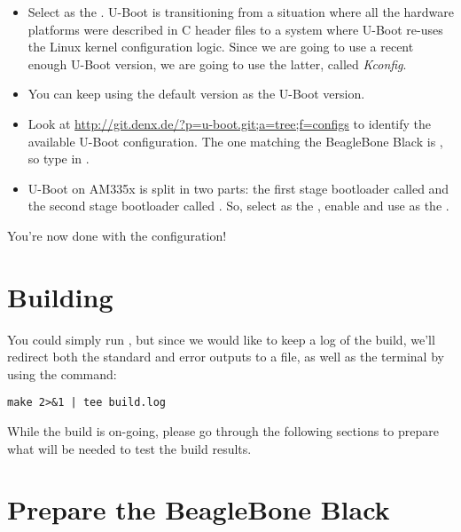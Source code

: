 \begin{itemize}
\begin{itemize}
  \item Select  as the . U-Boot is
    transitioning from a situation where all the hardware platforms
    were described in C header files to a system where U-Boot re-uses
    the Linux kernel configuration logic. Since we are going to use a
    recent enough U-Boot version, we are going to use the latter,
    called {\em Kconfig}.

  \item You can keep using the default  version as the
    U-Boot version.

  \item Look at
    \url{http://git.denx.de/?p=u-boot.git;a=tree;f=configs} to
    identify the available U-Boot configuration. The one matching the
    BeagleBone Black is , so type
     in .

  \item U-Boot on AM335x is split in two parts: the first stage
    bootloader called  and the second stage bootloader
    called . So, select  as the
    , enable  and use  as the .

  \end{itemize}

\end{itemize}

You're now done with the configuration!

\section{Building}

You could simply run , but since we would like to keep a
log of the build, we'll redirect both the standard and error outputs
to a file, as well as the terminal by using the  command:

\begin{verbatim}
make 2>&1 | tee build.log
\end{verbatim}

While the build is on-going, please go through the following sections
to prepare what will be needed to test the build results.

\section{Prepare the BeagleBone Black}

